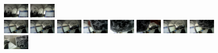 \documentclass{report}
\begin{document}
\begin{figure}
\includegraphics[width=0.115\textwidth]{images/sampleimage/197-4} 
\includegraphics[width=0.115\textwidth]{images/sampleimage/204-4} \\ \vspace{4pt}
\includegraphics[width=0.115\textwidth]{images/sampleimage/9-5} 
\includegraphics[width=0.115\textwidth]{images/sampleimage/32-5} 
\includegraphics[width=0.115\textwidth]{images/sampleimage/48-5} 
\includegraphics[width=0.115\textwidth]{images/sampleimage/67-5} 
\includegraphics[width=0.115\textwidth]{images/sampleimage/125-5} 
\includegraphics[width=0.115\textwidth]{images/sampleimage/155-5} 
\includegraphics[width=0.115\textwidth]{images/sampleimage/197-5} 
\includegraphics[width=0.115\textwidth]{images/sampleimage/204-5} \\ \vspace{4pt}
\includegraphics[width=0.115\textwidth]{images/sampleimage/9-6} 

\end{figure}
\end{document}
